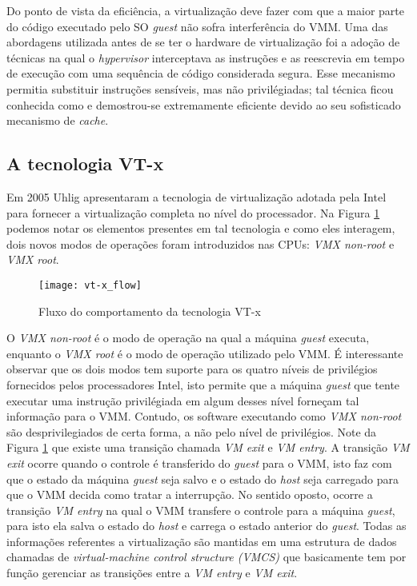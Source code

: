 Do ponto de vista da eficiência, a virtualização deve fazer com que a maior
parte do código executado pelo SO \emph{guest} não sofra interferência do VMM.
Uma das abordagens utilizada antes de se ter o hardware de virtualização foi a
adoção de técnicas na qual o \textit{hypervisor} interceptava as instruções e
as reescrevia em tempo de execução com uma sequência de código considerada
segura.
Esse mecanismo permitia substituir instruções sensíveis, mas não privilégiadas;
tal técnica ficou conhecida como  e demostrou-se
extremamente eficiente devido ao seu sofisticado mecanismo de \emph{cache}.


\subsection{A tecnologia VT-x}
\label{sec:vtx}

Em 2005 Uhlig \citep{uhlig} apresentaram a tecnologia de virtualização adotada
pela Intel para fornecer a virtualização completa no nível do processador. Na
Figura \ref{fig:vt-x_flow} podemos notar os elementos presentes em tal
tecnologia e como eles interagem, dois novos modos de operações foram
introduzidos nas CPUs: \emph{VMX non-root} e \emph{VMX root}.

\begin{figure}[!h]
  \centering
  \texttt{[image: vt-x\_flow]} 
  \caption{Fluxo do comportamento da tecnologia VT-x}
  \label{fig:vt-x_flow}
\end{figure}

O \emph{VMX non-root} é o modo de operação na qual a máquina \emph{guest}
executa, enquanto o \emph{VMX root} é o modo de operação utilizado pelo VMM. É
interessante observar que os dois modos tem suporte para os quatro níveis de
privilégios fornecidos pelos processadores Intel, isto permite que a máquina
\emph{guest} que tente executar uma instrução privilégiada em algum desses
nível forneçam tal informação para o VMM. Contudo, os software executando como
\emph{VMX non-root} são desprivilegiados de certa forma, a não pelo nível de
privilégios. Note da Figura \ref{fig:vt-x_flow} que existe uma transição chamada
\emph{VM exit} e \emph{VM entry}. A transição \emph{VM exit} ocorre quando o
controle é transferido do \emph{guest} para o VMM, isto faz com que o estado da
máquina \emph{guest} seja salvo e o estado do \emph{host} seja carregado para
que o VMM decida como tratar a interrupção. No sentido oposto, ocorre a
transição \emph{VM entry} na qual o VMM transfere o controle para a máquina
\emph{guest}, para isto ela salva o estado do \emph{host} e carrega o estado
anterior do \emph{guest}. Todas as informações referentes a virtualização são
mantidas em uma estrutura de dados chamadas de \emph{virtual-machine control
structure (VMCS)} que basicamente tem por função gerenciar as transições entre
a \emph{VM entry} e \emph{VM exit}.

